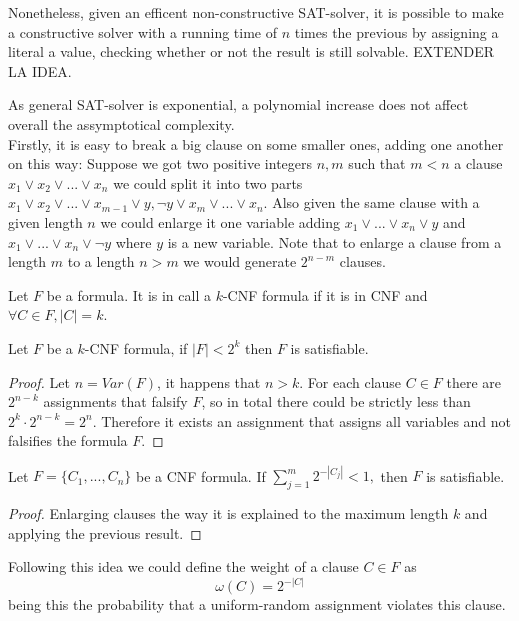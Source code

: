 Nonetheless, given an efficent non-constructive SAT-solver, it is possible to make a constructive solver with a running time of $n$ times the previous by assigning a literal a value, checking whether or not the result is still solvable. EXTENDER LA IDEA.


As general SAT-solver is exponential, a polynomial increase does not affect overall the assymptotical complexity.\\

Firstly, it is easy to break a big clause on some smaller ones, adding one another on this way: Suppose we got two positive integers $n,m$ such that $m < n$ a clause $x_1\vee x_2 \vee ... \vee x_n$ we could split it into two parts $x_1\vee x_2  \vee ... \vee x_{m-1} \vee y, \neg y \vee x_m \vee ... \vee x_n$. Also given the same clause with a given length $n$ we could enlarge it one variable adding $ x_1 \vee ... \vee x_n \vee y$ and $ x_1 \vee ... \vee x_n \vee \neg y$ where $y$ is a new variable. Note that to enlarge a clause from a length $m$ to a length $n>m$ we would generate $2^{n-m}$ clauses.

\begin{definition}
  Let $F$ be a formula. It is in call a $k$-CNF formula if it is in CNF and $\forall C \in F, |C| = k$.
\end{definition}


\begin{proposition}
	Let $F$ be a $k$-CNF formula, if $|F| < 2^k$ then $F$ is satisfiable.
\end{proposition}
\begin{proof}
	Let $n = Var(F)$, it happens that $n > k$. For each clause $C \in F$ there are $2^{n-k}$ assignments that falsify $F$, so in total there could be strictly less than $2^k \cdot 2^{n-k} = 2^n.$ Therefore it exists an assignment that assigns all variables and not falsifies the formula $F$.
\end{proof}
\begin{proposition}
	Let $F=\{C_1,...,C_n\}$ be a CNF formula. If $\sum_{j=1}^m 2^{-|C_j|}<1,$ then $F$ is satisfiable.
\end{proposition}
\begin{proof}
	Enlarging clauses the way it is explained to the maximum length $k$ and applying the previous result.
\end{proof}

Following this idea we could define the weight of a clause $C\in F$ as $$\omega(C) = 2^{-|C|} $$
being this the probability that a uniform-random assignment violates this clause. 

